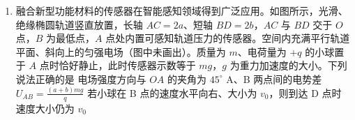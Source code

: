 \documentclass[\gkver]{gaokaozhenti}
\begin{document}
\begin{enumerate}
{可得波长 $\lambda = 4\Um$，故 B 正确；

A．结合 B 项分析可知 $x_{OM} = \frac{1}{2}\lambda = 2\Um$

所以该波的波速 $v = \frac{x_{OM}}{t} = 0.5\Ums$，故 A 错误；

C．从题图示状态经过 $2\Us$，则波沿 $x$ 轴正方向传播了 $\Delta x = 1\Um = \frac{\lambda}{4}$，故 $M$ 从平衡位置运动到了波峰位置，速度为 $0$，$N$ 从波谷位置运动到了平衡位置，速度最大，显然两点速度不同，故 C 错误；

D．该波的周期 $T = \frac{\lambda}{v} = 8\Us$

从图示时刻计时，$M$ 的振动方程为 $y_{M} = A\sin\frac{\pi}{4}t$

$N$ 的振动方程为 $y_{N} = A\sin\left(\frac{\pi}{4}t - \frac{\pi}{2}\right)$

经 $t = 3\Us$ 后，$y_{M} = y_{N} = \frac{\sqrt{2}}{2}A$，故 D 正确。

故选 BD。
}

\item
融合新型功能材料的传感器在智能感知领域得到广泛应用。如图所示，光滑、绝缘椭圆轨道竖直放置，长轴 $AC = 2a$、短轴 $BD = 2b$，$AC$ 与 $BD$ 交于 $O$ 点，$B$ 为最低点，$A$ 点处内置可感知轨道压力的传感器。空间内充满平行轨道平面、斜向上的匀强电场（图中未画出）。质量为 $m$、电荷量为 $+q$ 的小球置于 $A$ 点时恰好静止，此时传感器示数等于 $mg$，$g$ 为重力加速度的大小。下列说法正确的是 
\onepicture[w=5.97cm]{}
{电场强度方向与 $OA$ 的夹角为 $45^{\circ}$}
{A、B 两点间的电势差 $U_{AB} = \frac{(a + b)mg}{q}$}
{若小球在 B 点的速度水平向右、大小为 $v_{0}$，则到达 D 点时速度大小仍为 $v_{0}$}
\end{enumerate}
\end{document}
